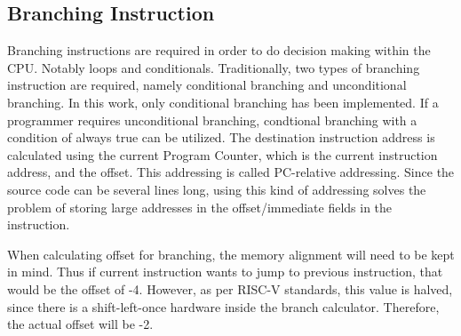 \begin{table}[!h]
    \centering
    \caption{Load/Store Instructions}
    \label{table:load/store_instructions}
\end{table}

\subsection{Branching Instruction}
Branching instructions are required in order to do decision making within the CPU.
Notably loops and conditionals. Traditionally, two types of branching instruction are required, namely
conditional branching and unconditional branching. In this work, only conditional branching
has been implemented. If a programmer requires unconditional branching, condtional branching with a condition of always true
can be utilized. The destination instruction address is calculated using the current Program Counter, which is the current instruction address,
and the offset. This addressing is called PC-relative addressing. Since the source code can be several lines long,
using this kind of addressing solves the problem of storing large addresses in the offset/immediate fields in the instruction.

When calculating offset for branching, the memory alignment will need to be kept in mind.
Thus if current instruction wants to jump to previous instruction, that would be the offset of -4.
However, as per RISC-V standards, this value is halved, since there is a shift-left-once hardware inside the branch calculator.
Therefore, the actual offset will be -2.

